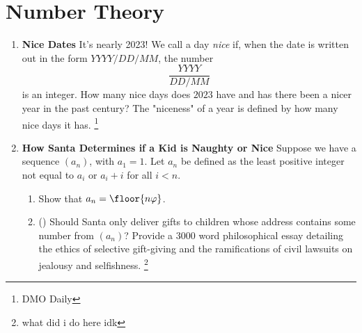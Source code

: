 \documentclass[11pt]{scrartcl}
\begin{document}
\section{Number Theory}
\begin{enumerate}[label=\textbf{N\arabic*}.]
    \item \textbf{Nice Dates} \newline
    It's nearly 2023! We call a day \textit{nice} if, when the date is written out in the form $YYYY/DD/MM$, the number
    \[ \frac{YYYY}{DD/MM} \]
    is an integer. How many nice days does $2023$ have and has there been a nicer year in the past century? The "niceness" of a year is defined by how many nice days it has.
    \footnote{DMO Daily}

    \item \textbf{How Santa Determines if a Kid is Naughty or Nice} \newline
    Suppose we have a sequence $(a_n)$, with $a_1 = 1$. Let $a_n$ be defined as the least positive integer not equal to $a_i$ or $a_i + i$ for all $i < n$. 

    \begin{enumerate}
        \item Show that $a_n = \floor{n\varphi}$.

        \item (\fullchili) Should Santa only deliver gifts to children whose address contains some number from $(a_n)$? Provide a $3000$ word philosophical essay detailing the ethics of selective gift-giving and the ramifications of civil lawsuits on jealousy and selfishness. \footnote{what did i do here idk}
    \end{enumerate}
    
\end{enumerate}
\end{document}

